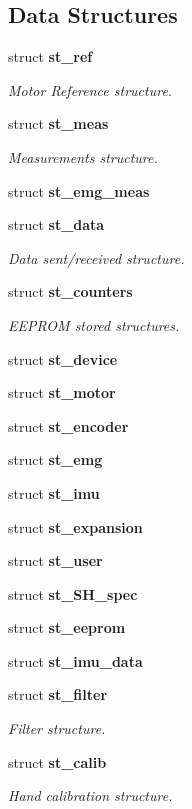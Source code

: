 \subsection*{Data Structures}
\begin{DoxyCompactItemize}
\item 
struct \textbf{ st\+\_\+ref}
\begin{DoxyCompactList}\small\item\em Motor Reference structure. \end{DoxyCompactList}\item 
struct \textbf{ st\+\_\+meas}
\begin{DoxyCompactList}\small\item\em Measurements structure. \end{DoxyCompactList}\item 
struct \textbf{ st\+\_\+emg\+\_\+meas}
\item 
struct \textbf{ st\+\_\+data}
\begin{DoxyCompactList}\small\item\em Data sent/received structure. \end{DoxyCompactList}\item 
struct \textbf{ st\+\_\+counters}
\begin{DoxyCompactList}\small\item\em E\+E\+P\+R\+OM stored structures. \end{DoxyCompactList}\item 
struct \textbf{ st\+\_\+device}
\item 
struct \textbf{ st\+\_\+motor}
\item 
struct \textbf{ st\+\_\+encoder}
\item 
struct \textbf{ st\+\_\+emg}
\item 
struct \textbf{ st\+\_\+imu}
\item 
struct \textbf{ st\+\_\+expansion}
\item 
struct \textbf{ st\+\_\+user}
\item 
struct \textbf{ st\+\_\+\+S\+H\+\_\+spec}
\item 
struct \textbf{ st\+\_\+eeprom}
\item 
struct \textbf{ st\+\_\+imu\+\_\+data}
\item 
struct \textbf{ st\+\_\+filter}
\begin{DoxyCompactList}\small\item\em Filter structure. \end{DoxyCompactList}\item 
struct \textbf{ st\+\_\+calib}
\begin{DoxyCompactList}\small\item\em Hand calibration structure. \end{DoxyCompactList}\end{DoxyCompactItemize}
